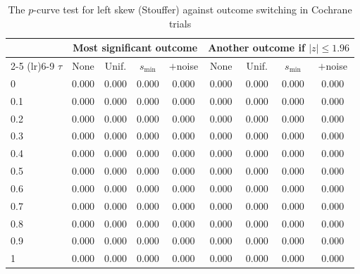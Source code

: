 \begin{table}[htbp]
\centering
\caption{The $p$-curve test for left skew (Stouffer) against outcome switching in Cochrane trials}
\label{tab:cochrane_switching_power_stouffer}
\footnotesize
\setlength{\tabcolsep}{4pt}
\begin{tabular}{lcccccccc}
\toprule
 & \multicolumn{4}{c}{Most significant outcome} & \multicolumn{4}{c}{Another outcome if $|z| \le 1.96$} \\
\cmidrule(lr){2-5} \cmidrule(lr){6-9}
$\tau$ & None & Unif. & $s_{\min}$ & $+$noise & None & Unif. & $s_{\min}$ & $+$noise \\
\midrule
0 & 0.000 & 0.000 & 0.000 & 0.000 & 0.000 & 0.000 & 0.000 & 0.000 \\
0.1 & 0.000 & 0.000 & 0.000 & 0.000 & 0.000 & 0.000 & 0.000 & 0.000 \\
0.2 & 0.000 & 0.000 & 0.000 & 0.000 & 0.000 & 0.000 & 0.000 & 0.000 \\
0.3 & 0.000 & 0.000 & 0.000 & 0.000 & 0.000 & 0.000 & 0.000 & 0.000 \\
0.4 & 0.000 & 0.000 & 0.000 & 0.000 & 0.000 & 0.000 & 0.000 & 0.000 \\
0.5 & 0.000 & 0.000 & 0.000 & 0.000 & 0.000 & 0.000 & 0.000 & 0.000 \\
0.6 & 0.000 & 0.000 & 0.000 & 0.000 & 0.000 & 0.000 & 0.000 & 0.000 \\
0.7 & 0.000 & 0.000 & 0.000 & 0.000 & 0.000 & 0.000 & 0.000 & 0.000 \\
0.8 & 0.000 & 0.000 & 0.000 & 0.000 & 0.000 & 0.000 & 0.000 & 0.000 \\
0.9 & 0.000 & 0.000 & 0.000 & 0.000 & 0.000 & 0.000 & 0.000 & 0.000 \\
1 & 0.000 & 0.000 & 0.000 & 0.000 & 0.000 & 0.000 & 0.000 & 0.000 \\
\bottomrule
\end{tabular}
\par\smallskip

\end{table}
